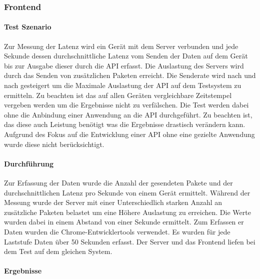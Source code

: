 \documentclass[a4paper]{spie}  %
\begin{document}
\subsubsection{Frontend}

\paragraph{Test Szenario} Zur Messung der Latenz wird ein Gerät mit dem Server verbunden und jede Sekunde dessen durchschnittliche Latenz vom Senden der Daten auf dem Gerät bis zur Ausgabe dieser durch die API erfasst. Die Auslastung des Servers wird durch das Senden von zusätzlichen Paketen erreicht. Die Senderate wird nach und nach gesteigert um die Maximale Auslastung der API auf dem Testsystem zu ermitteln. Zu beachten ist das auf allen Geräten vergleichbare Zeitstempel vergeben werden um die Ergebnisse nicht zu verfälschen. Die Test werden dabei ohne die Anbindung einer Anwendung an die API durchgeführt. Zu beachten ist, das diese auch Leistung benötigt was die Ergebnisse drastisch verändern kann. Aufgrund des Fokus auf die Entwicklung einer API ohne eine gezielte Anwendung wurde diese nicht berücksichtigt.


\paragraph{Durchführung}
Zur Erfassung der Daten wurde die Anzahl der gesendeten Pakete und der durchschnittlichen Latenz pro Sekunde von einem Gerät ermittelt. Während der Messung wurde der Server mit einer Unterschiedlich starken Anzahl an zusätzliche Paketen belastet um eine Höhere Auslastung zu erreichen. Die Werte wurden dabei in einem Abstand von einer Sekunde ermittelt. Zum Erfassen er Daten wurden die Chrome-Entwicklertools verwendet. Es wurden für jede Laststufe Daten über 50 Sekunden erfasst. Der Server und das Frontend liefen bei dem Test auf dem gleichen System.


\paragraph{Ergebnisse}
\end{document}
